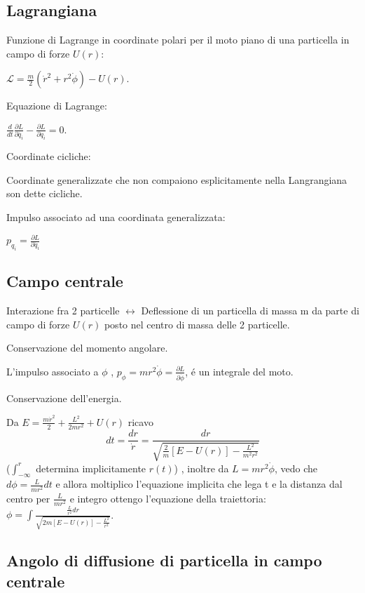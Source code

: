 \documentclass[main.tex]{subfiles}
\begin{document}
\subsection{Lagrangiana}
Funzione di Lagrange in coordinate polari per il moto piano di una particella in campo di forze $U(r)$:

$\mathcal{L}=\frac{m}{2}(\dot{r}^2+r^2\dot{\phi})-U(r)$.

Equazione di Lagrange:

$\frac{d}{dt}\frac{\partial L}{\partial \dot{q_i}}-\frac{\partial L}{\partial q_i}=0$.

Coordinate cicliche:

Coordinate generalizzate che non compaiono esplicitamente nella Langrangiana son dette cicliche.

Impulso associato ad una coordinata generalizzata:

$p_{q_i}=\frac{\partial L}{\partial \dot{q_i}}$


\subsection{Campo centrale}

Interazione fra 2 particelle $\leftrightarrow$ Deflessione di un particella di massa m da parte di campo di forze $U(r)$ posto nel centro di massa delle 2 particelle.

Conservazione del momento angolare.

L'impulso associato a $\phi$ , $p_{\phi}=mr^2\dot{\phi}=\frac{\partial L}{\partial \dot{\phi}}$, \'e un integrale del moto.

Conservazione dell'energia.

Da $E=\frac{m\dot{r}^2}{2}+\frac{L^2}{2mr^2}+U(r)$ ricavo
\begin{equation*}
dt=\frac{dr}{\dot{r}}=\frac{dr}{\sqrt{\frac{2}{m}[E-U(r)]-\frac{L^2}{m^2r^2}}}
\end{equation*}
($\int_{-\infty}^{r}$ determina implicitamente $r(t)$) , inoltre da $L=mr^2\dot{\phi}$, vedo che $d\phi=\frac{L}{mr^2}dt$ e allora moltiplico l'equazione implicita che lega t e la distanza dal centro per $\frac{L}{mr^2}$ e integro ottengo l'equazione della traiettoria: $\phi=\int\frac{\frac{L}{r^2}dr}{\sqrt{2m[E-U(r)]-\frac{L^2}{r^2}}}$.

\subsection{Angolo di diffusione di particella in campo centrale}
\end{document}
